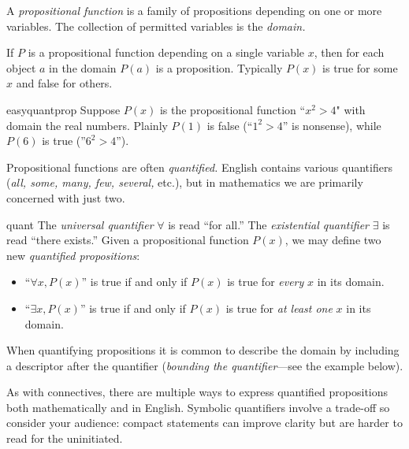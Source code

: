 \begin{defn}{}{}
	A \emph{propositional function} is a family of propositions depending on one or more variables. The collection of permitted variables is the \emph{domain.}
\end{defn}

If $P$ is a propositional function depending on a single variable $x$, then for each object $a$ in the domain $P(a)$ is a proposition. Typically $P(x)$ is true for some $x$ and false for others.

\begin{example}{}{easyquantprop}
	Suppose $P(x)$ is the propositional function ``$x^2>4$" with domain the real numbers. Plainly $P(1)$ is false (``$1^2>4$'' is nonsense), while $P(6)$ is true (''$6^2>4$'').
\end{example}


Propositional functions are often \emph{quantified.} English contains various quantifiers (\emph{all, some, many, few, several,} etc.), but in mathematics we are primarily concerned with just two.


\begin{defn}{}{quant}
	The \emph{universal quantifier} $\forall$ is read ``for all.'' The \emph{existential quantifier} $\exists$ is read ``there exists.'' Given a propositional function $P(x)$, we may define two new \emph{quantified propositions}:
	\begin{itemize}
	  \item ``$\forall x, P(x)$'' is true if and only if $P(x)$ is true for \emph{every} $x$ in its domain.
	  \item ``$\exists x, P(x)$'' is true if and only if $P(x)$ is true for \emph{at least one} $x$ in its domain.
	\end{itemize}
	When quantifying propositions it is common to describe the domain by including a descriptor after the quantifier (\emph{bounding the quantifier}---see the example below).
\end{defn}

As with connectives, there are multiple ways to express quantified propositions both mathematically and in English. Symbolic quantifiers involve a trade-off so consider your audience: compact statements can improve clarity but are harder to read for the uninitiated. %

